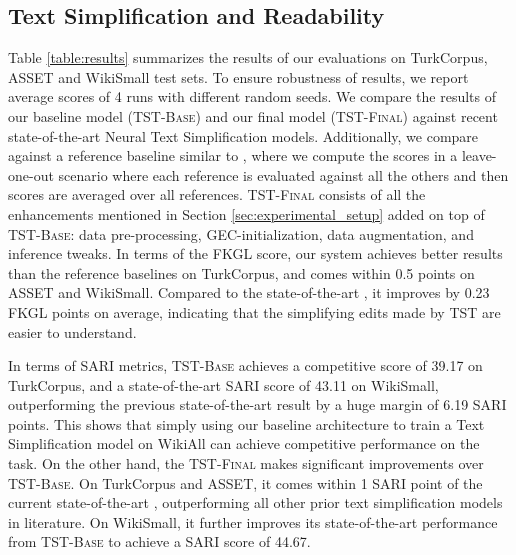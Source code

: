 \documentclass[11pt,a4paper]{article}
\begin{document}
\subsection{Text Simplification and Readability}

Table \ref{table:results} summarizes the results of our evaluations on TurkCorpus, ASSET and WikiSmall test sets. To ensure robustness of results, we report average scores of 4 runs with different random seeds. We compare the results of our baseline model (\textsc{TST-Base}) and our final model (\textsc{TST-Final}) against recent state-of-the-art Neural  Text  Simplification models. Additionally, we compare against a reference baseline similar to  \citet{martin2020multilingual}, where we 
compute the scores in a leave-one-out scenario where each reference is evaluated against all the others and then scores are averaged over all references. \textsc{TST-Final} consists of all the enhancements mentioned in Section \ref{sec:experimental_setup} added on top of \textsc{TST-Base}: data pre-processing, GEC-initialization, data augmentation, and inference tweaks.
In terms of the FKGL score, our system achieves better results than the reference baselines on TurkCorpus, and comes within 0.5 points on ASSET and WikiSmall. Compared to the state-of-the-art \cite{martin2020multilingual}, it improves by 0.23 FKGL points on average, indicating that the simplifying edits made by TST are easier to understand. 

In terms of SARI metrics, 
\textsc{TST-Base} achieves a competitive score of 39.17 on TurkCorpus, and a state-of-the-art SARI score of 43.11 on WikiSmall, outperforming the previous state-of-the-art result by a huge margin of 6.19 SARI points. This shows that simply using our baseline architecture to train a Text Simplification model on WikiAll can achieve competitive performance on the task. On the other hand, the \textsc{TST-Final} makes significant improvements over \textsc{TST-Base}. On TurkCorpus and ASSET, it comes within 1 SARI point of the current state-of-the-art \cite{martin2020multilingual}, outperforming all other prior text simplification models in literature. On WikiSmall, it further improves its state-of-the-art performance from \textsc{TST-Base} to achieve a SARI score of 44.67. 
\end{document}
